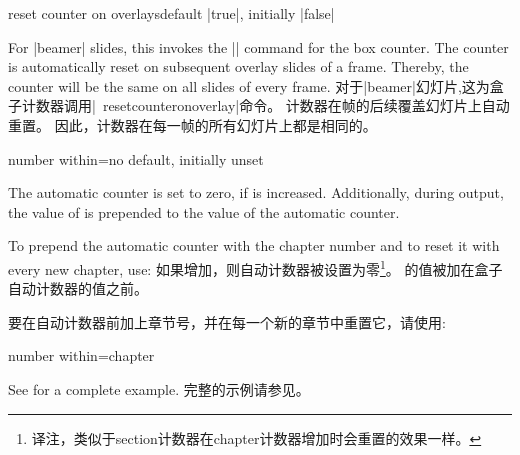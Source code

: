 
\begin{newTcbKey}[][doc new=2019-10-18]{reset counter on overlays}{}{default |true|, initially |false|}
\begin{stripedbox}
For |beamer| slides, this invokes the |\resetcounteronoverlays| command for the box counter. 
The counter is automatically reset on subsequent overlay slides of a frame.
Thereby, the counter will be the same on all slides of every frame.
\tcblower
对于|beamer|幻灯片,这为盒子计数器调用|\ resetcounteronoverlay|命令。
计数器在帧的后续覆盖幻灯片上自动重置。
因此，计数器在每一帧的所有幻灯片上都是相同的。
\end{stripedbox}
\end{newTcbKey}

\begin{newTcbKey}{number within}{=}{no default, initially unset}
\begin{stripedbox}
The automatic counter is set to zero, if  is increased.
Additionally, during output, 
the value of  is prepended to the value of the automatic counter.\par
To prepend the automatic counter with the chapter number and to reset it with every new chapter, use:
\tcblower
如果增加，则自动计数器被设置为零\footnote{译注，类似于section计数器在chapter计数器增加时会重置的效果一样。}。
的值被加在盒子自动计数器的值之前。\par
要在自动计数器前加上章节号，并在每一个新的章节中重置它，请使用:
\end{stripedbox}

\begin{dispListing}
number within=chapter
\end{dispListing}
\begin{stripedbox}
See  for a complete example.
\tcblower
完整的示例请参见。
\end{stripedbox}
\end{newTcbKey}


